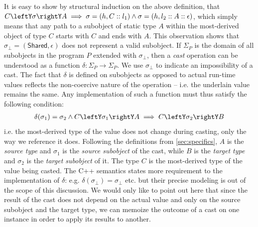 It is easy to show by structural induction on the above definition, that 
$C\leftY\sigma\rightY A \implies \sigma=(h,C::l_1) \wedge \sigma=(h,l_2::A::\epsilon)$, 
which simply means that any path to a subobject of static type $A$ within the 
most-derived object of type $C$ starts with $C$ and ends with $A$. This 
observation shows that $\sigma_\bot = (\mathsf{Shared},\epsilon)$ does not 
represent a valid subobject. If $\Sigma_P$ is the domain of all subobjects in 
the program $P$ extended with $\sigma_\bot$, then a \emph{cast} operation can be 
understood as a function $\delta : \Sigma_P \rightarrow \Sigma_P$. We use 
$\sigma_\bot$ to indicate an impossibility of a cast. The fact that $\delta$ is 
defined on subobjects as opposed to actual run-time values reflects the 
non-coercive nature of the operation -- i.e. the underlain value remains the 
same. Any implementation of such a function must thus satisfy the following 
condition:
\begin{eqnarray*}
\delta(\sigma_1) = \sigma_2 \wedge C \leftY\sigma_1\rightY A \implies C \leftY\sigma_2\rightY B
\end{eqnarray*}
\noindent
i.e. the most-derived type of the value does not change during casting, only the way 
we reference it does. Following the definitions from 
\textsection\ref{sec:specifics}, $A$ is the \emph{source type} and $\sigma_1$ is 
the \emph{source subobject} of the cast, while $B$ is the \emph{target type} and 
$\sigma_2$ is the \emph{target subobject} of it. The type $C$ is the 
most-derived type of the value being casted. The C++ semantics states more 
requirement to the implementation of $\delta$: e.g. 
$\delta(\sigma_\bot) = \sigma_\bot$ etc. but their precise modeling is out of 
the scope of this discussion. We would only like to point out here that since 
the result of the cast does not depend on the actual value and only on the 
source subobject and the target type, we can memoize the outcome of a cast on 
one instance in order to apply its results to another.

